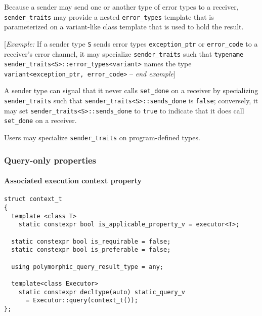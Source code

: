 \documentclass[a4paper,12pt,notitlepage,twoside,openright]{article}
\begin{document}
Because a sender may send one or another type of error types to a
receiver, \texttt{sender_traits} may provide a nested
\texttt{error_types} template that is parameterized on a
variant-like class template that is used to hold the result.

{[}\emph{Example:} If a sender type \texttt{S} sends error
types \texttt{exception_ptr} or
\texttt{error_code} to a receiver's error channel, it may
specialize \texttt{sender_traits} such that
\texttt{typename sender_traits<S>::error_types<variant>}
names the type \texttt{variant<exception_ptr, error_code>}
-- \emph{end example}{]}

A sender type can signal that it never calls
\texttt{set_done} on a receiver by specializing
\texttt{sender_traits} such that
\texttt{sender_traits<S>::sends_done} is
\texttt{false}; conversely, it may set
\texttt{sender_traits<S>::sends_done} to
\texttt{true} to indicate that it does call
\texttt{set_done} on a receiver.

Users may specialize \texttt{sender_traits} on
program-defined types.

\hypertarget{query-only-properties}{%
\subsubsection{Query-only properties}\label{query-only-properties}}

\hypertarget{associated-execution-context-property}{%
\paragraph{Associated execution context
property}\label{associated-execution-context-property}}

\begin{verbatim}
struct context_t
{
  template <class T>
    static constexpr bool is_applicable_property_v = executor<T>;

  static constexpr bool is_requirable = false;
  static constexpr bool is_preferable = false;

  using polymorphic_query_result_type = any;

  template<class Executor>
    static constexpr decltype(auto) static_query_v
      = Executor::query(context_t());
};
\end{verbatim}
\end{document}

